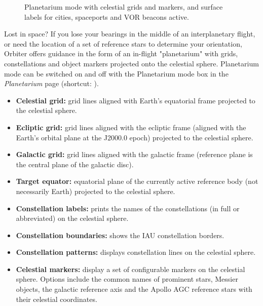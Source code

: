 \documentclass[Orbiter User Manual.tex]{subfiles}
\begin{document}
\begin{figure}[H]
	\centering
	\caption{Planetarium mode with celestial grids and markers, and surface labels for cities, spaceports and VOR beacons active.}
\end{figure}

\noindent
Lost in space? If you lose your bearings in the middle of an interplanetary flight, or need the location of a set of reference stars to determine your orientation, Orbiter offers guidance in the form of an in-flight "planetarium" with grids, constellations and object markers projected onto the celestial sphere. Planetarium mode can be switched on and off with the Planetarium mode box in the \textit{Planetarium} page (shortcut: ).


\begin{figure}[H]
	\centering
\end{figure}

\begin{itemize}
\item \textbf{Celestial grid:} grid lines aligned with Earth's equatorial frame projected to the celestial sphere.
\item \textbf{Ecliptic grid:} grid lines aligned with the ecliptic frame (aligned with the Earth's orbital plane at the J2000.0 epoch) projected to the celestial sphere.
\item \textbf{Galactic grid:} grid lines aligned with the galactic frame (reference plane is the central plane of the galactic disc).
\item \textbf{Target equator:} equatorial plane of the currently active reference body (not necessarily Earth) projected to the celestial sphere.
\item \textbf{Constellation labels:} prints the names of the constellations (in full or abbreviated) on the celestial sphere.
\item \textbf{Constellation boundaries:} shows the IAU constellation borders.
\item \textbf{Constellation patterns:} displays constellation lines on the celestial sphere.
\item \textbf{Celestial markers:} display a set of configurable markers on the celestial sphere. Options include the common names of prominent stars, Messier objects, the galactic reference axis and the Apollo AGC reference stars with their celestial coordinates.
\end{itemize}
\end{document}
